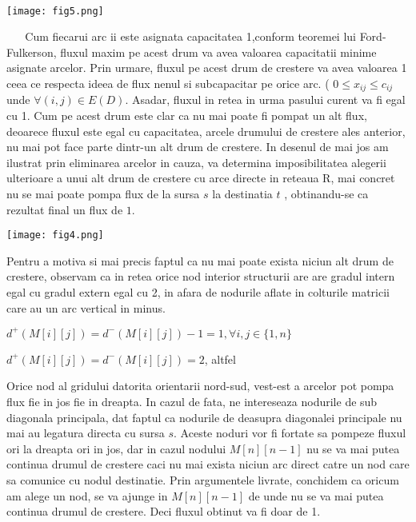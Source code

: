 \documentclass{article}
\begin{document}
\
\newline
\begin{center}
\texttt{[image: fig5.png]}
\end{center}
\
\newline
\
\newline
Cum fiecarui arc ii este asignata capacitatea 1,conform teoremei lui Ford-Fulkerson, fluxul maxim pe acest drum va avea valoarea capacitatii minime asignate arcelor. Prin urmare, fluxul pe acest drum de crestere va avea valoarea 1 ceea ce respecta ideea de flux nenul si subcapacitar pe orice arc. ( $ 0 \leq x_{ij} \leq c_{ij}$ unde $\forall (i,j) \in E(D)$. Asadar, fluxul in retea in urma pasului curent va fi egal cu 1.
\newline
\newline
Cum pe acest drum este clar ca nu mai poate fi pompat un alt flux, deoarece fluxul este egal cu capacitatea, arcele drumului de crestere ales anterior, nu mai pot face parte dintr-un alt drum de crestere. In desenul de mai jos am ilustrat prin eliminarea arcelor in cauza, va determina imposibilitatea alegerii ulterioare a  unui alt drum de crestere cu arce directe in reteaua R, mai concret nu se mai poate pompa flux de la sursa $s$ la destinatia  $t$ , obtinandu-se ca rezultat final un flux de $1$.
\begin{center}
\texttt{[image: fig4.png]}
\end{center}
Pentru a motiva si mai precis faptul ca nu mai poate exista niciun alt drum de crestere, observam ca in retea orice nod interior structurii are are gradul intern egal cu gradul extern egal cu 2, in afara de nodurile aflate in colturile matricii care au un arc vertical in minus.
\begin{center}
$d^+(M[i][j])= d^-(M[i][j])-1=1, \forall i,j \in \{1,n\}$
\end{center}
\begin{center}
$d^+(M[i][j])= d^-(M[i][j])=2$, altfel
\end{center}
Orice nod al gridului datorita orientarii nord-sud, vest-est a arcelor pot pompa flux fie in jos fie in dreapta. In cazul de fata, ne intereseaza nodurile de sub diagonala principala, dat faptul ca nodurile de deasupra diagonalei principale nu mai au legatura directa cu sursa $s$.  Aceste noduri vor fi fortate sa pompeze fluxul ori la dreapta ori in jos, dar in cazul nodului $M[n][n-1]$ nu se va mai putea continua drumul de crestere caci nu mai exista niciun arc direct catre un nod care sa comunice cu nodul destinatie.
\newline
\newline
Prin argumentele livrate, conchidem ca oricum am alege un nod, se va ajunge in $M[n][n-1]$ de unde nu se va mai putea continua drumul de crestere. Deci fluxul obtinut va fi doar de 1.
\end{document}
